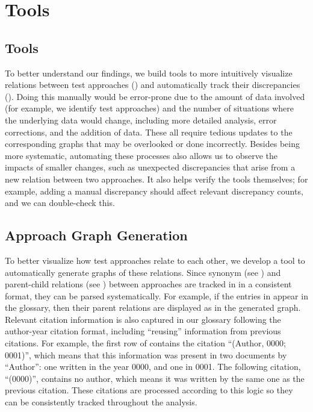 \ifnotpaper
    \section{Tools}
\else
    \subsection{Tools}
\fi
\label{tools}

\ifnotpaper
    To better understand our findings, we build tools to more intuitively
    visualize relations between test approaches () and
    automatically track their discrepancies (). Doing
    this manually would be error-prone due to the amount of data involved (for
    example, we identify \approachCount{} test approaches) and the number of
    situations where the underlying data would change, including more detailed
    analysis, error corrections, and the addition of data. These all require
    tedious updates to the corresponding graphs that may be overlooked or done
    incorrectly. Besides being more systematic, automating these processes also
    allows us to observe the impacts of smaller changes, such as unexpected
    discrepancies that arise from a new relation between two approaches. It
    also helps verify the tools themselves; for example, adding a manual
    discrepancy should affect relevant discrepancy counts, and we can
    double-check this.

    \subsection{Approach Graph Generation}
    \label{graph-gen}
\fi

To better visualize how test approaches relate to each other, we
develop a tool to automatically generate graphs of these relations.
\ifnotpaper Since synonym (see ) and parent-child relations
    (see ) between approaches are tracked in
    \ourApproachGlossary{} in a consistent format, they can be parsed
    systematically. For example, if the entries in 
    appear in the glossary, then their parent relations are displayed as
     in the generated graph. Relevant citation
    information is also captured in our glossary following the author-year
    citation format, including ``reusing'' information from previous
    citations. For example, the first row of 
    contains the citation ``(Author, 0000; 0001)'', which means that this
    information was present in two documents by ``Author'': one written in
    the year 0000, and one in 0001. The following citation, ``(0000)'',
    contains no author, which means it was written by the same one as the
    previous citation. These citations are processed according to this
    logic  so they can be
    consistently tracked throughout the analysis.

